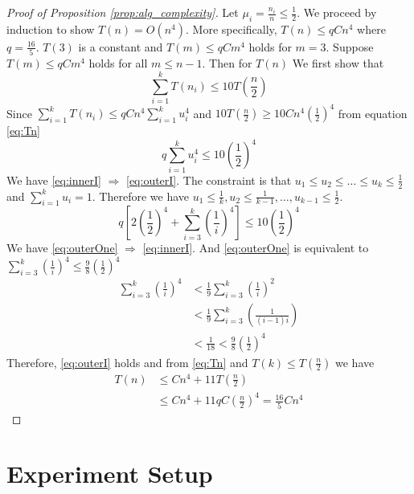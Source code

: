 \begin{proof}[Proof of Proposition \ref{prop:alg_complexity}]
Let $\mu_i = \frac{n_i}{n} \leq \frac{1}{2}$. We proceed by induction to show $T(n) = O(n^4)$. More specifically, $T(n) \leq q C n^4$ where $ q = \frac{16}{5}$. $T(3)$ is a constant and $T(m) \leq q C m^4$ holds for $m=3$. Suppose
	$T(m) \leq qC m^4$ holds for all $m \leq n-1$. Then for $T(n)$
	We first show that 
	\begin{equation}\label{eq:outerI}
	\sum_{i=1}^k T(n_i) \leq 10 T(\frac{n}{2})
	\end{equation}
	Since $\sum_{i=1}^k T(n_i) \leq qC n^4\sum_{i=1}^k u_i^4$ and $10 T(\frac{n}{2}) \geq 10Cn^4 (\frac{1}{2})^4$ from equation \eqref{eq:Tn}
	\begin{equation}\label{eq:innerI}
       q\sum_{i=1}^k u_i^4 \leq 10 (\frac{1}{2})^4 
	\end{equation}
	We have \eqref{eq:innerI} $\Rightarrow$ \eqref{eq:outerI}. The constraint is that $u_1\leq u_2 \leq \dots \leq u_k \leq \frac{1}{2}$ and $\sum_{i=1}^k u_i = 1$. Therefore we have $u_1 \leq \frac{1}{k}, u_2 \leq \frac{1}{k-1}, \dots, u_{k-1} \leq \frac{1}{2}$.
	\begin{equation}\label{eq:outerOne}
	 q[2(\frac{1}{2})^4 + \sum_{i=3}^k (\frac{1}{i})^4] \leq 10 (\frac{1}{2})^4
	\end{equation}
	We have \eqref{eq:outerOne} $\Rightarrow$ \eqref{eq:innerI}. And \eqref{eq:outerOne} is equivalent to
	$\sum_{i=3}^k (\frac{1}{i})^4 \leq \frac{9}{8}(\frac{1}{2})^4$
	\begin{align*}
		\sum_{i=3}^k (\frac{1}{i})^4 & < \frac{1}{9}\sum_{i=3}^k (\frac{1}{i})^2 \\
		& < \frac{1}{9}\sum_{i=3}^k (\frac{1}{(i-1)i}) \\
		& < \frac{1}{18} < \frac{9}{8}(\frac{1}{2})^4
	\end{align*}
	Therefore, \eqref{eq:outerI} holds and from \eqref{eq:Tn} and $T(k) \leq T(\frac{n}{2})$ we have 
	\begin{align}
		T(n)  & \leq Cn^4 + 11T(\frac{n}{2}) \\
		& \leq C n^4 + 11 q C (\frac{n}{2})^4 = \frac{16}{5} C n^4
	\end{align}
\end{proof}	
\section{Experiment Setup}


